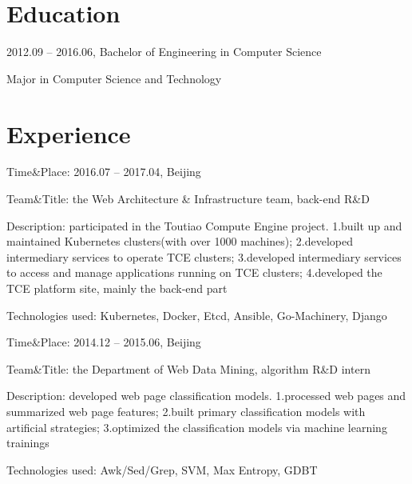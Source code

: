 \documentclass[letterpaper, 12pt]{resume}
\begin{document}
\section{Education}
\begin{items}
    \item 2012.09 {--} 2016.06, Bachelor of Engineering in Computer Science
    \item Major in Computer Science and Technology
\end{items}
\endplace{}
\endsection{}

\section{Experience}
\begin{items}
    \item Time\&Place: 2016.07 {--} 2017.04, Beijing
    \item Team\&Title: the Web Architecture \& Infrastructure team, back-end R\&D
    \item Description: participated in the Toutiao Compute Engine project. 1.built up and maintained Kubernetes clusters(with over 1000 machines); 2.developed intermediary services to operate TCE clusters; 3.developed intermediary services to access and manage applications running on TCE clusters; 4.developed the TCE platform site, mainly the back-end part
    \item Technologies used: Kubernetes, Docker, Etcd, Ansible, Go-Machinery, Django
\end{items}
\endplace{}
\begin{items}
    \item Time\&Place: 2014.12 {--} 2015.06, Beijing
    \item Team\&Title: the Department of Web Data Mining, algorithm R\&D intern
    \item Description: developed web page classification models. 1.processed web pages and summarized web page features; 2.built primary classification models with artificial strategies; 3.optimized the classification models via machine learning trainings
    \item Technologies used: Awk/Sed/Grep, SVM, Max Entropy, GDBT
\end{items}
\endplace{}
\endsection{}
\end{document}
